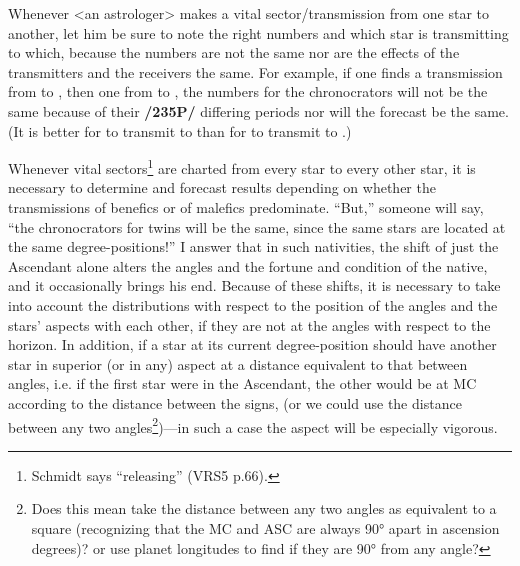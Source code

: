 Whenever <an astrologer> makes a vital sector/transmission from one star to another, let him be sure to note the right numbers and which star is transmitting to which, because the numbers are not the same nor are the effects of the transmitters and the receivers the same. For example, if one finds a transmission from \Jupiter\xspace to \Mars, then one from \Mars\xspace to \Jupiter, the numbers for the chronocrators will not be the same because of their \textbf{/235P/} differing periods nor will the forecast be the same. (It is better for \Mars\xspace to transmit to \Jupiter than for \Jupiter\xspace to transmit to \Mars.) 

Whenever vital sectors\footnote{Schmidt says ``releasing'' (VRS5 p.66).} are charted from every star to every other star, it is necessary to determine and forecast results depending on whether the transmissions of benefics or of malefics predominate.
“But,” someone will say, “the chronocrators for twins will be the same, since the same stars are located at the same degree-positions!” I answer that in such nativities, the shift of just the Ascendant alone
alters the angles and the fortune and condition of the native, and it occasionally brings his end. Because of these shifts, it is necessary to take into account the distributions with respect to the position of the angles and the stars’ aspects with each other, if they are not at the angles with respect to the horizon. In addition, if a star at its current degree-position should have another star in superior (or in any) aspect at a distance equivalent to that between angles, i.e. if the first star were in the Ascendant, the other would be at MC according to the distance between the signs, (or we could use the distance between any two angles\footnote{Does this mean take the distance between any two angles as equivalent to a square (recognizing that the MC and ASC are always 90° apart in ascension degrees)? or use planet longitudes to find if they are 90° from any angle?})—in such a case the aspect will be especially vigorous.

